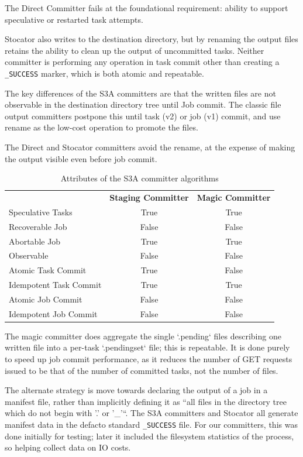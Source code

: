 \documentclass[9pt,technote]{IEEEtran}
\begin{document}
The Direct Committer fails at the foundational requirement: ability to support
speculative or restarted task attempts.

Stocator also writes to the destination directory, but by renaming the output
files retains the ability to clean up the output of uncommitted tasks.
Neither committer is performing any operation in task commit other than creating
a \texttt{\_SUCCESS} marker, which is both atomic and repeatable.


The key differences of the S3A committers are that the written files are
not observable in the destination directory tree until Job commit.
The classic file output committers postpone this until task (v2) or job (v1)
commit, and use rename as the low-cost operation to promote the files.


The Direct and Stocator committers avoid the rename, at the expense of making
the output visible even before job commit.

\begin{table}
  \label{tab:s3a-committer-attributes}
  \begin{tabular}{ l c c }
    \hline
    & \textbf{Staging Committer} & \textbf{Magic Committer} \\
    Speculative Tasks & True & True \\
    Recoverable Job & False & False \\
    Abortable Job & True & True \\
    Observable & False & False \\
    Atomic Task Commit & True & False \\
    Idempotent Task Commit & True & True \\
    Atomic Job Commit & False & False \\
    Idempotent Job Commit & False & False \\
    \hline
  \end{tabular}
  \caption{Attributes of the S3A committer algorithms}
\end{table}


The magic committer does aggregate the single `.pending` files describing
one written file into a per-task `.pendingset` file;
this is repeatable.
It is done purely to speed up job commit performance, as it reduces the
number of GET requests issued to be that of the number of committed tasks,
not the number of files.


The alternate strategy is move towards declaring the output of a job in
a manifest file, rather than implicitly defining it as ``all files in the directory
tree which do not begin with '.' or '\_'``.
The S3A committers and Stocator all generate manifest data in the defacto
standard \texttt{\_SUCCESS} file.
For our committers, this was done initially for testing;
later it included the filesystem statistics of the process, so helping
collect data on IO costs.
\end{document}
